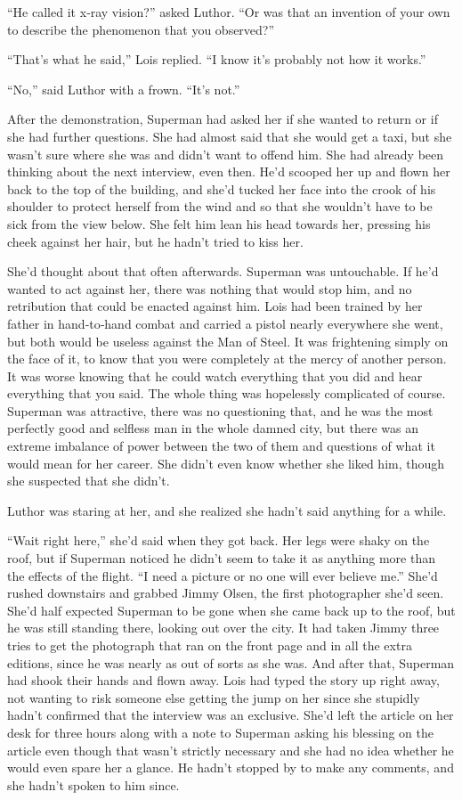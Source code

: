 \documentclass[ebook,12pt]{memoir}
\begin{document}
``He called it x‐ray vision?'' asked Luthor. ``Or was that an invention
of your own to describe the phenomenon that you observed?''

``That's what he said,'' Lois replied. ``I know it's probably not how it
works.''

``No,'' said Luthor with a frown. ``It's not.''

After the demonstration, Superman had asked her if she wanted to return
or if she had further questions. She had almost said that she would get
a taxi, but she wasn't sure where she was and didn't want to offend him.
She had already been thinking about the next interview, even then. He'd
scooped her up and flown her back to the top of the building, and she'd
tucked her face into the crook of his shoulder to protect herself from
the wind and so that she wouldn't have to be sick from the view below.
She felt him lean his head towards her, pressing his cheek against her
hair, but he hadn't tried to kiss her.

She'd thought about that often afterwards. Superman was untouchable. If
he'd wanted to act against her, there was nothing that would stop him,
and no retribution that could be enacted against him. Lois had been
trained by her father in hand‐to‐hand combat and carried a pistol nearly
everywhere she went, but both would be useless against the Man of Steel.
It was frightening simply on the face of it, to know that you were
completely at the mercy of another person. It was worse knowing that he
could watch everything that you did and hear everything that you said.
The whole thing was hopelessly complicated of course. Superman was
attractive, there was no questioning that, and he was the most perfectly
good and selfless man in the whole damned city, but there was an extreme
imbalance of power between the two of them and questions of what it
would mean for her career. She didn't even know whether she liked him,
though she suspected that she didn't.

Luthor was staring at her, and she realized she hadn't said anything for
a while.

``Wait right here,'' she'd said when they got back. Her legs were shaky
on the roof, but if Superman noticed he didn't seem to take it as
anything more than the effects of the flight. ``I need a picture or no
one will ever believe me.'' She'd rushed downstairs and grabbed Jimmy
Olsen, the first photographer she'd seen. She'd half expected Superman
to be gone when she came back up to the roof, but he was still standing
there, looking out over the city. It had taken Jimmy three tries to get
the photograph that ran on the front page and in all the extra editions,
since he was nearly as out of sorts as she was. And after that, Superman
had shook their hands and flown away. Lois had typed the story up right
away, not wanting to risk someone else getting the jump on her since she
stupidly hadn't confirmed that the interview was an exclusive. She'd
left the article on her desk for three hours along with a note to
Superman asking his blessing on the article even though that wasn't
strictly necessary and she had no idea whether he would even spare her a
glance. He hadn't stopped by to make any comments, and she hadn't spoken
to him since.
\end{document}
